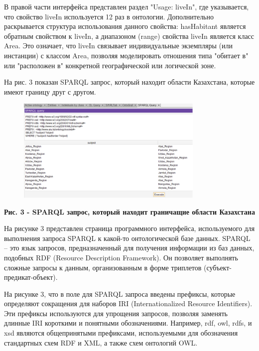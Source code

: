 В правой части интерфейса представлен раздел "Usage: liveIn", где
указывается, что свойство \textquotesingle liveIn\textquotesingle{}
используется 12 раз в онтологии. Дополнительно раскрывается структура
использования данного свойства:
\textquotesingle hasHabitant\textquotesingle{} является обратным
свойством к \textquotesingle liveIn\textquotesingle, а диапазоном
(range) свойства \textquotesingle liveIn\textquotesingle{} является
класс \textquotesingle Area\textquotesingle. Это означает, что
\textquotesingle liveIn\textquotesingle{} связывает индивидуальные
экземпляры (или инстанции) с классом
\textquotesingle Area\textquotesingle, позволяя моделировать отношения
типа "обитает в" или "расположен в" конкретной географической или
логической зоне.

На рис. 3 показан SPARQL запрос, который находит области Казахстана,
которые имеют границу друг с другом.

\begin{figure}[H]
	\centering
	\includegraphics[width=0.8\textwidth]{assets/40}
	\caption*{}
\end{figure}

\textbf{Рис. 3 - SPARQL запрос, который находит граничащие области
Казахстана}

На рисунке 3 представлен страница программного интерфейса, используемого
для выполнения запроса SPARQL к какой-то онтологической базе данных.
SPARQL -- это язык запросов, предназначенный для получения информации из
баз данных, подобных RDF (Resource Description Framework). Он позволяет
выполнять сложные запросы к данным, организованным в форме триплетов
(субъект-предикат-объект).

На рисунке 3, что в поле для SPARQL запроса введены префиксы, которые
определяют сокращения для наборов IRI (Internationalized Resource
Identifiers). Эти префиксы используются для упрощения запросов, позволяя
заменять длинные IRI короткими и понятными обозначениями. Например, rdf,
owl, rdfs, и xsd являются общепринятыми префиксами, используемыми для
обозначения стандартных схем RDF и XML, а также схем онтологий OWL.

